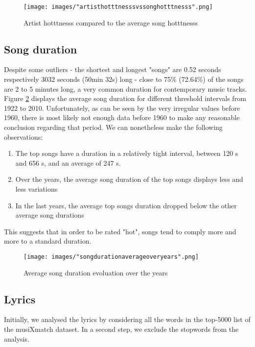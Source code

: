 \documentclass[10pt]{article}
\renewcommand\_{\textunderscore\allowbreak}
\begin{document}
\begin{figure}[h!]
\centering
\captionsetup{width=1.0\textwidth}
\texttt{[image: images/"artist\_hotttnesss\_vs\_song\_hotttnesss".png]}
\caption{Artist hotttnesss compared to the average song hotttnesss}
\label{fig:artist_hotttnesss}
\end{figure}

\subsection{Song duration}
Despite some outliers - the shortest and longest "songs" are 0.52 seconds respectively 3032 seconds (50min 32s) long - close to 75\% (72.64\%) of the songs are 2 to 5 minutes long, a very common duration for contemporary music tracks.
Figure \ref{fig:song_duration_over_years} displays the average song duration for different threshold intervals from 1922 to 2010.
Unfortunately, as can be seen by the very irregular values before 1960, there is most likely not enough data before 1960 to make any reasonable conclusion regarding that period. 
We can nonetheless make the following observations:
\begin{enumerate}
\itemsep 0mm
\item The top songs have a duration in a relatively tight interval, between 120 s and 656 s, and an average of 247 s.
\item Over the years, the average song duration of the top songs displays less and less variations
\item In the last years, the average top songs duration dropped below the other average song durations
\end{enumerate}
This suggests that in order to be rated "hot", songs tend to comply more and more to a standard duration.

\begin{figure}[h!]
\centering
\captionsetup{width=1.0\textwidth}
\texttt{[image: images/"song\_duration\_average\_over\_years".png]}
\caption{Average song duration evoluation over the years}
\label{fig:song_duration_over_years}
\end{figure}

\subsection{Lyrics}
Initially, we analysed the lyrics by considering all the words in the top-5000 list of the musiXmatch dataset. In a second step, we exclude the stopwords from the analysis.
\end{document}
